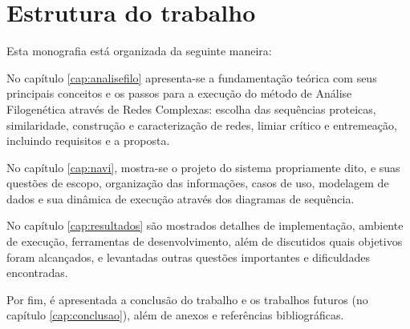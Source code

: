 \section{Estrutura do trabalho}

Esta monografia está organizada da seguinte maneira:

No capítulo \ref{cap:analisefilo} apresenta-se a fundamentação teórica com seus principais conceitos
e os passos para a execução do método de Análise Filogenética através de Redes Complexas: escolha das sequências proteicas,
similaridade, construção e caracterização de redes, limiar crítico e entremeação, incluindo requisitos e a proposta.

No capítulo \ref{cap:navi}, mostra-se o projeto do sistema propriamente dito, e suas questões
de escopo, organização das informações, casos de uso, modelagem de dados e sua dinâmica de execução através dos diagramas de sequência.

No capítulo \ref{cap:resultados} são mostrados detalhes de implementação, ambiente de execução, ferramentas de
desenvolvimento, além de discutidos quais objetivos foram alcançados, e levantadas outras questões importantes e dificuldades encontradas.

Por fim, é apresentada a conclusão do trabalho e os trabalhos futuros (no capítulo \ref{cap:conclusao}), além de anexos e referências bibliográficas.





